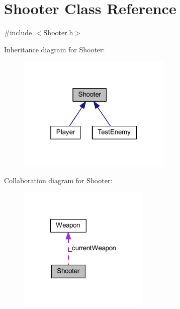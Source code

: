 \hypertarget{class_shooter}{
\section{Shooter Class Reference}
\label{dd/d07/class_shooter}
}


{\ttfamily \#include $<$Shooter.h$>$}



Inheritance diagram for Shooter:
\nopagebreak
\begin{figure}[H]
\begin{center}
\leavevmode
\includegraphics[width=208pt]{d0/d65/class_shooter__inherit__graph}
\end{center}
\end{figure}


Collaboration diagram for Shooter:
\nopagebreak
\begin{figure}[H]
\begin{center}
\leavevmode
\includegraphics[width=178pt]{dc/d6d/class_shooter__coll__graph}
\end{center}
\end{figure}
